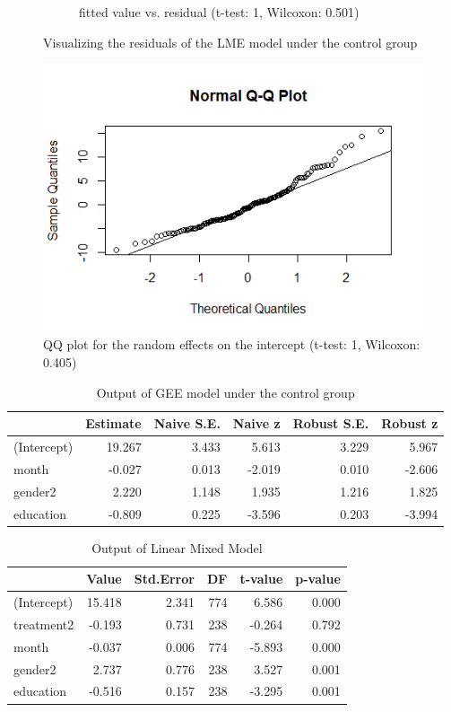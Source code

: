 \begin{figure}[H]
\begin{subfigure}{.5\textwidth}
  \caption{fitted value vs. residual (t-test: 1, Wilcoxon: 0.501)}
\end{subfigure}
\caption{Visualizing the residuals of the LME model under the control group}
\label{fig:residual.control}
\end{figure}

\begin{figure}[H]
\centering
\includegraphics[width=0.5\linewidth]{../../plots/qq_intercept_treatment.png}
\caption{QQ plot for the random effects on the intercept (t-test: 1, Wilcoxon: 0.405)}
\label{fig:re.control}
\end{figure}

\begin{table}[H]
\centering
\begin{tabular}{|l|r|r|r|r|r|}
\hline
  & Estimate & Naive S.E. & Naive z & Robust S.E. & Robust z\\
\hline
(Intercept) & 19.267 & 3.433 & 5.613 & 3.229 & 5.967\\
\hline
month & -0.027 & 0.013 & -2.019 & 0.010 & -2.606\\
\hline
gender2 & 2.220 & 1.148 & 1.935 & 1.216 & 1.825\\
\hline
education & -0.809 & 0.225 & -3.596 & 0.203 & -3.994\\
\hline
\end{tabular}
\caption{Output of GEE model under the control group}
\label{tab:gee.control}
\end{table}

\begin{table}[H]
\centering
\begin{tabular}{|l|r|r|r|r|r|}
\hline
  & Value & Std.Error & DF & t-value & p-value\\
\hline
(Intercept) & 15.418 & 2.341 & 774 & 6.586 & 0.000\\
\hline
treatment2 & -0.193 & 0.731 & 238 & -0.264 & 0.792\\
\hline
month & -0.037 & 0.006 & 774 & -5.893 & 0.000\\
\hline
gender2 & 2.737 & 0.776 & 238 & 3.527 & 0.001\\
\hline
education & -0.516 & 0.157 & 238 & -3.295 & 0.001\\
\hline
\end{tabular}
\caption{Output of Linear Mixed Model}
\label{tab:lme}
\end{table}

